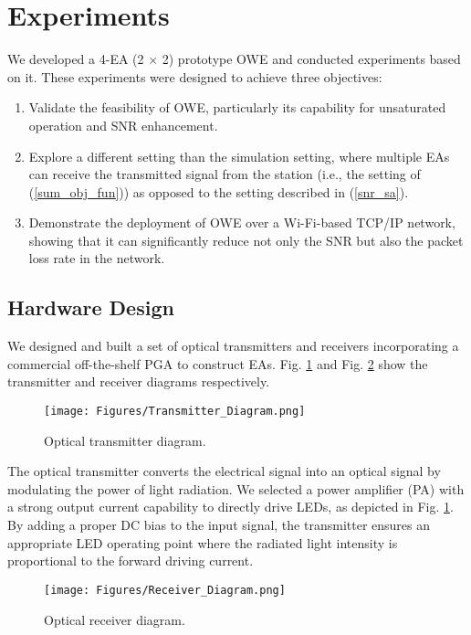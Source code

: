 \section{Experiments}
We developed a 4-EA (2 $\times$ 2) prototype OWE and conducted experiments based on it. These experiments were designed to achieve three objectives:

\begin{enumerate}
    \item Validate the feasibility of OWE, particularly its capability for unsaturated operation and SNR enhancement.
    \item Explore a different setting than the simulation setting, where multiple EAs can receive the transmitted signal from the station (i.e., the setting of (\ref{sum_obj_fun})) as opposed to the setting described in (\ref{snr_sa}).
    \item Demonstrate the deployment of OWE over a Wi-Fi-based TCP/IP network, showing that it can significantly reduce not only the SNR but also the packet loss rate in the network.
\end{enumerate}
\subsection{Hardware Design}
We designed and built a set of optical transmitters and receivers incorporating a commercial off-the-shelf PGA to construct EAs. Fig. \ref{transmitter_diagram} and Fig. \ref{receiver_diagram} show the transmitter and receiver diagrams respectively.
\begin{figure}
\centering
\texttt{[image: Figures/Transmitter\_Diagram.png]}
\caption{Optical transmitter diagram.}
\label{transmitter_diagram}
\vspace{-0.2cm}
\end{figure}

The optical transmitter converts the electrical signal into an optical signal by modulating the power of light radiation. We selected a power amplifier (PA) with a strong output current capability to directly drive LEDs, as depicted in Fig. \ref{transmitter_diagram}. By adding a proper DC bias to the input signal, the transmitter ensures an appropriate LED operating point where the radiated light intensity is proportional to the forward driving current.

\begin{figure}
\centering
\texttt{[image: Figures/Receiver\_Diagram.png]}
\caption{Optical receiver diagram.}
\label{receiver_diagram}
\vspace{-0.5cm}
\end{figure}

